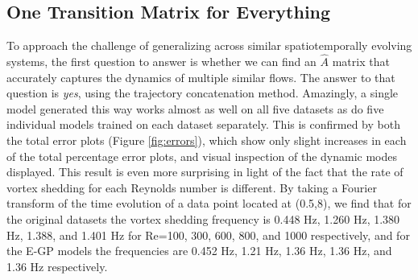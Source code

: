 \documentclass[letterpaper,12pt,peerreviewca,draftcls]{IEEEtran}
\newcommand{\dualop}{A}
\newcommand{\dualopApprox}{\widehat{\dualop}}
\begin{document}
\subsection{One Transition Matrix for Everything}\label{sec:lotr}

To approach the challenge of generalizing across similar spatiotemporally evolving systems, the first question to answer is whether we can find an $\dualopApprox$ matrix that accurately captures the dynamics of multiple similar flows. The answer to that question is \textit{yes}, using the trajectory concatenation method. Amazingly, a single model generated this way works almost as well on all five datasets as do five individual models trained on each dataset separately. This is confirmed by both the total error plots (Figure \ref{fig:errors}), which show only slight increases in each of the total percentage error plots, and visual inspection of the dynamic modes displayed. This result is even more surprising in light of the fact that the rate of vortex shedding for each Reynolds number is different. By taking a Fourier transform of the time evolution of a data point located at (0.5,8), we find that for the original datasets the vortex shedding frequency is 0.448 Hz, 1.260 Hz, 1.380 Hz, 1.388, and 1.401 Hz for Re=100, 300, 600, 800, and 1000 respectively, and for the E-GP models the frequencies are 0.452 Hz, 1.21 Hz, 1.36 Hz, 1.36 Hz, and 1.36 Hz respectively.
\end{document}
